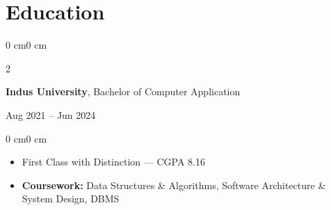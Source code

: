 \documentclass[10pt, letterpaper]{article}
\newenvironment{highlights}{
    \begin{itemize}[
        topsep=0.08 cm,
        parsep=0.08 cm,
        partopsep=0pt,
        itemsep=0pt,
        leftmargin=0.4 cm
    ]
}{
    \end{itemize}
}
\newenvironment{onecolentry}{
    \begin{adjustwidth}{0 cm}{0 cm}
}{
    \end{adjustwidth}
}
\newenvironment{twocolentry}[2][]{
    \onecolentry
    \def\secondColumn{#2}
    \setcolumnwidth{\fill, 4.5 cm}
    \begin{paracol}{2}
}{
    \switchcolumn \raggedleft \secondColumn
    \end{paracol}
    \endonecolentry
}
\begin{document}
    \section{Education}

    \begin{twocolentry}{Aug 2021 -- Jun 2024}
        \textbf{Indus University}, Bachelor of Computer Application
    \end{twocolentry}

    \vspace{0.08 cm}
    \begin{onecolentry}
        \begin{highlights}
            \item First Class with Distinction --- CGPA 8.16
            \item \textbf{Coursework:} Data Structures \& Algorithms, Software Architecture \& System Design, DBMS
        \end{highlights}
    \end{onecolentry}
\end{document}
